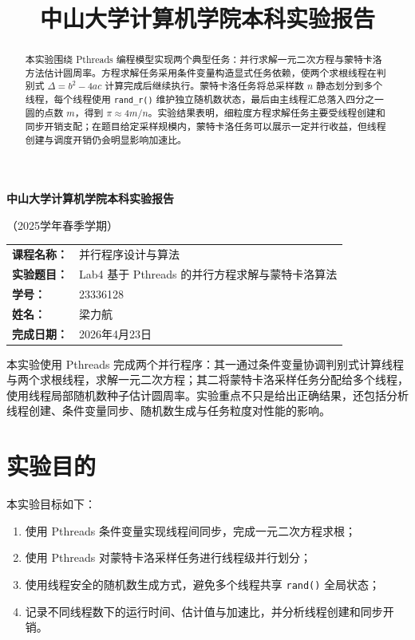 \documentclass[UTF8,a4paper,12pt,fontset=none]{ctexart}
\title{\bfseries 中山大学计算机学院本科实验报告}
\author{}
\date{}
\begin{document}
\begin{titlepage}
  \centering
  {\bfseries 中山大学计算机学院本科实验报告\par}
  \vspace{0.5em}
  {（2025学年春季学期）\par}
  \vspace{2em}

  \begin{tabularx}{0.9\textwidth}{>{\bfseries}p{4cm}X}
    课程名称： & 并行程序设计与算法 \\
    实验题目： & Lab4 基于 Pthreads 的并行方程求解与蒙特卡洛算法 \\
    学号： & 23336128 \\
    姓名： & 梁力航 \\
    完成日期： & 2026年4月23日 \\
  \end{tabularx}

  \vfill
  \begin{minipage}{0.88\textwidth}
    \small
    本实验使用 Pthreads 完成两个并行程序：其一通过条件变量协调判别式计算线程与两个求根线程，求解一元二次方程；其二将蒙特卡洛采样任务分配给多个线程，使用线程局部随机数种子估计圆周率。实验重点不只是给出正确结果，还包括分析线程创建、条件变量同步、随机数生成与任务粒度对性能的影响。
  \end{minipage}
\end{titlepage}

\begin{abstract}
本实验围绕 Pthreads 编程模型实现两个典型任务：并行求解一元二次方程与蒙特卡洛方法估计圆周率。方程求解任务采用条件变量构造显式任务依赖，使两个求根线程在判别式 \(\Delta=b^2-4ac\) 计算完成后继续执行。蒙特卡洛任务将总采样数 \(n\) 静态划分到多个线程，每个线程使用 \texttt{rand\_r()} 维护独立随机数状态，最后由主线程汇总落入四分之一圆的点数 \(m\)，得到 \(\pi\approx 4m/n\)。实验结果表明，细粒度方程求解任务主要受线程创建和同步开销支配；在题目给定采样规模内，蒙特卡洛任务可以展示一定并行收益，但线程创建与调度开销仍会明显影响加速比。
\end{abstract}

\section{实验目的}

本实验目标如下：
\begin{enumerate}[leftmargin=2.2em]
  \item 使用 Pthreads 条件变量实现线程间同步，完成一元二次方程求根；
  \item 使用 Pthreads 对蒙特卡洛采样任务进行线程级并行划分；
  \item 使用线程安全的随机数生成方式，避免多个线程共享 \texttt{rand()} 全局状态；
  \item 记录不同线程数下的运行时间、估计值与加速比，并分析线程创建和同步开销。
\end{enumerate}
\end{document}
